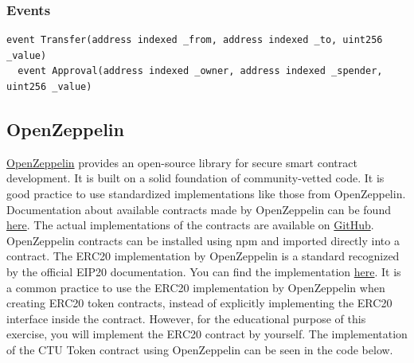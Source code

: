 \documentclass[12pt]{article}
\begin{document}
\subsubsection*{Events}

\noindent
\begin{minipage}{\textwidth}
\begin{lstlisting}[language=Solidity]
  event Transfer(address indexed _from, address indexed _to, uint256 _value)
  event Approval(address indexed _owner, address indexed _spender, uint256 _value)  
\end{lstlisting}
\end{minipage}

\subsection*{OpenZeppelin}

\href{https://www.openzeppelin.com/}{OpenZeppelin} provides an open-source library for secure smart contract development. It is built on a solid
foundation of community-vetted code. It is good practice to use standardized implementations like those from OpenZeppelin. Documentation about available contracts made by OpenZeppelin can be found \href{https://docs.openzeppelin.com/contracts/4.x/}{here}. The actual implementations of the contracts are available on \href{https://github.com/OpenZeppelin/openzeppelin-contracts}{GitHub}. OpenZeppelin contracts can be installed using npm and imported directly into a contract. The ERC20 implementation by OpenZeppelin is a standard recognized by the official EIP20 documentation. You can find the implementation \href{https://github.com/OpenZeppelin/openzeppelin-contracts/blob/master/contracts/token/ERC20/ERC20.sol}{here}. It is a common practice to use the ERC20 implementation by OpenZeppelin when creating ERC20 token contracts, instead of explicitly implementing the ERC20 interface inside the contract. However, for the educational purpose of this exercise, you will implement the ERC20 contract by yourself. The implementation of the CTU Token contract using OpenZeppelin can be seen in the code below.
\end{document}
